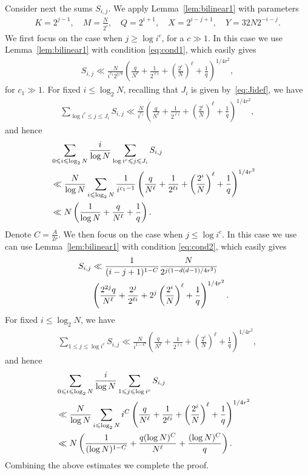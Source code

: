 \documentclass[12pt]{amsart}
\def\\{\cr}
\def\le{\leqslant}
\def\ge{\geqslant}
\begin{document}
Consider next the sums $S_{i,j}$. We apply Lemma~\ref{lem:bilinear1} with parameters 
\begin{align*}
K=2^{j-1}, \quad M=\frac{N}{2^{i}}, \quad Q=2^{i+1}, \quad X=2^{i-j+1}, \quad Y=32N2^{-i-j}.
\end{align*}
We first focus on the case when $j \ge \log i^c$, for a $c\gg1$. In this case we use Lemma~\ref{lem:bilinear1} with condition \eqref{eq:cond1}, which easily gives 
\begin{align*}
S_{i,j}\ll \frac{N}{i^{c_1}2^{j/8}}  \left(\frac{q}{N^{\ell}}+\frac{1}{2^{\ell i}}+\left(\frac{2^{i}}{N}\right)^{\ell}+\frac{1}{q}\right)^{1/4r^2},
\end{align*}
for $c_1\gg1$.
For fixed $i\le \log_2{N}$, recalling that $J_i$ is given by~\eqref{eq:Jidef}, we have 
\begin{align*}
\sum_{\log i^c\le j \le J_i}S_{i,j}\ll \frac{N}{i^{c_1}} \left(\frac{q}{N^{\ell}}+\frac{1}{2^{\ell i}}+\left(\frac{2^{i}}{N}\right)^{\ell}+\frac{1}{q}\right)^{1/4r^2},
\end{align*}
and hence 
\begin{align*}
&\sum_{0\le i\le \log_2{N}}\frac{i}{\log{N}}\sum_{\log i^c\le j \le J_i}S_{i,j} \\ &  \ll \frac{N}{\log{N}}\sum_{i\le \log_2{N}}\frac{1}{i^{c_1-1}}\left(\frac{q}{N^{\ell}}+\frac{1}{2^{\ell i}}+\left(\frac{2^{i}}{N}\right)^{\ell}+\frac{1}{q}\right)^{1/4r^2} \\
& \ll N\left(\frac{1}{\log{N}}+\frac{q}{N^{\ell}}+\frac{1}{q}\right).
\end{align*}
Denote $C = \frac{A}{2r}$. We then focus on the case when $j \le \log i^c$. In this case we use can use Lemma~\ref{lem:bilinear1} with condition \eqref{eq:cond2}, which easily gives 
\begin{align*}
S_{i,j}&\ll \frac{1}{(i-j+1)^{1-C}}\frac{N}{2^{j(1-d(d-1)/4r^2)}} \\ & \left(\frac{2^{2j}q}{N^{\ell}}+\frac{2^{j}}{2^{\ell i}}+2^{j}\left(\frac{2^{i}}{N}\right)^{\ell}+\frac{1}{q}\right)^{1/4r^2}.
\end{align*}
For fixed $i\le \log_2{N}$, we have 
\begin{align*}
\sum_{1\le j \le \log i^c}S_{i,j}\ll \frac{N}{i^{1-C}} \left(\frac{q}{N^{\ell}}+\frac{1}{2^{\ell i}}+\left(\frac{2^{i}}{N}\right)^{\ell}+\frac{1}{q}\right)^{1/4r^2},
\end{align*}
and hence 
\begin{align*}
&\sum_{0\le i\le \log_2{N}}\frac{i}{\log{N}}\sum_{1\le j \le \log i^c}S_{i,j} \\ &  \ll \frac{N}{\log{N}}\sum_{i\le \log_2{N}}i^{C}\left(\frac{q}{N^{\ell}}+\frac{1}{2^{\ell i}}+\left(\frac{2^{i}}{N}\right)^{\ell}+\frac{1}{q}\right)^{1/4r^2} \\
& \ll N\left(\frac{1}{(\log{N})^{1-C}}+\frac{q(\log{N})^{C}}{N^{\ell}}+\frac{(\log{N})^{C}}{q}\right).
\end{align*}
Combining the above estimates we complete the proof.
\end{document}
